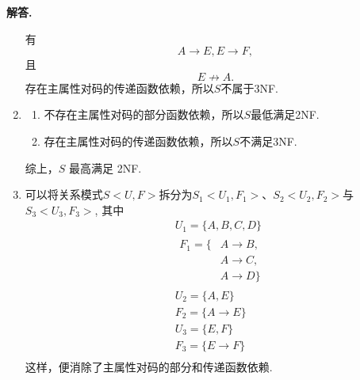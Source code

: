 \documentclass[12pt, a4paper, oneside]{ctexart}
\newenvironment{solution}{\par\noindent\textbf{解答. }}{\par}
\begin{document}
\begin{solution}
\begin{enumerate}[(1)]
            有$$A\rightarrow E, E\rightarrow F,$$
            且$$E\not\rightarrow A.$$
            存在主属性对码的传递函数依赖，所以$S$不属于3NF.
        \item 
            \begin{enumerate}[$1^\circ$]
                \item 不存在主属性对码的部分函数依赖，所以$S$最低满足2NF.
                \item 存在主属性对码的传递函数依赖，所以$S$不满足3NF.
            \end{enumerate}
            综上，$S$ 最高满足 2NF.
        \item 
            可以将关系模式$S<U, F>$拆分为$S_1<U_1, F_1>$、$S_2<U_2, F_2>$与$S_3<U_3, F_3>$, 其中
            $$
                \begin{aligned}
                    & U_1 = \{A, B, C, D\} \\
                    & \begin{aligned}
                        F_1 = \{ &A\rightarrow B, \\
                        & A\rightarrow C, \\
                        & A\rightarrow D\}
                    \end{aligned} \\
                    & U_2 = \{A, E\} \\
                    & F_2 = \{A \rightarrow E\} \\
                    & U_3 = \{E, F\} \\
                    & F_3 = \{E \rightarrow F\} \\
                \end{aligned}
            $$
            这样，便消除了主属性对码的部分和传递函数依赖.
    \end{enumerate}
\end{solution}
\end{document}
